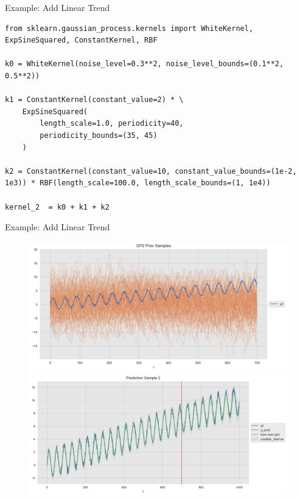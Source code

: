 \documentclass[10pt]{beamer}
\begin{document}
\begin{frame}[fragile]{Example: Add Linear Trend }
\begin{lstlisting}
from sklearn.gaussian_process.kernels import WhiteKernel, ExpSineSquared, ConstantKernel, RBF

k0 = WhiteKernel(noise_level=0.3**2, noise_level_bounds=(0.1**2, 0.5**2))

k1 = ConstantKernel(constant_value=2) * \ 
    ExpSineSquared(
        length_scale=1.0, periodicity=40, 
        periodicity_bounds=(35, 45)
    )

k2 = ConstantKernel(constant_value=10, constant_value_bounds=(1e-2, 1e3)) * RBF(length_scale=100.0, length_scale_bounds=(1, 1e4)) 

kernel_2  = k0 + k1 + k2
\end{lstlisting}
\end{frame}

\begin{frame}{Example: Add Linear Trend }
\begin{center}
\begin{figure}
\includegraphics[scale=0.30]{images/gaussian_process_time_series_files/gaussian_process_time_series_44_0.png}
\includegraphics[scale=0.30]{images/gaussian_process_time_series_files/gaussian_process_time_series_49_0.png}
\end{figure}
\end{center}
\end{frame}
\end{document}
